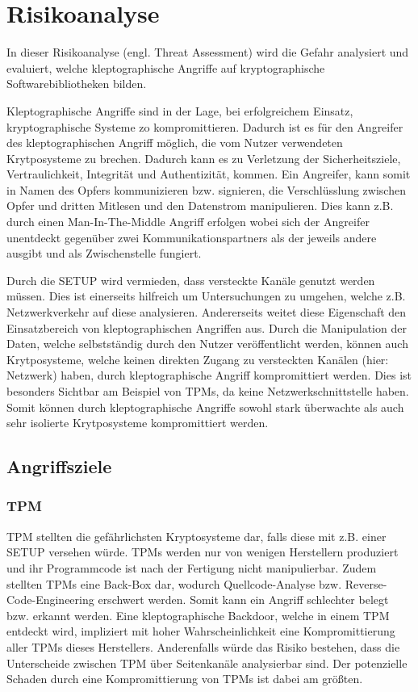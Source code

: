 \chapter{Risikoanalyse}
    In dieser Risikoanalyse (engl. Threat Assessment) wird die Gefahr analysiert und evaluiert, welche kleptographische Angriffe auf kryptographische Softwarebibliotheken bilden.

    Kleptographische Angriffe sind in der Lage, bei erfolgreichem Einsatz, kryptographische Systeme zo kompromittieren. Dadurch ist es für den Angreifer des kleptographischen Angriff möglich, die vom Nutzer verwendeten Krytposysteme zu brechen. Dadurch kann es zu Verletzung der Sicherheitsziele, Vertraulichkeit, Integrität und Authentizität, kommen. Ein Angreifer, kann somit in Namen des Opfers kommunizieren bzw. signieren, die Verschlüsslung zwischen Opfer und dritten Mitlesen und den Datenstrom manipulieren. Dies kann z.B. durch einen Man-In-The-Middle Angriff erfolgen wobei sich der Angreifer unentdeckt gegenüber zwei Kommunikationspartners als der jeweils andere ausgibt und als Zwischenstelle fungiert.

    Durch die \ac{SETUP} wird vermieden, dass versteckte Kanäle genutzt werden müssen. Dies ist einerseits hilfreich um Untersuchungen zu umgehen, welche z.B. Netzwerkverkehr auf diese analysieren. Andererseits weitet diese Eigenschaft den Einsatzbereich von kleptographischen Angriffen aus. Durch die Manipulation der Daten, welche selbstständig durch den Nutzer veröffentlicht werden, können auch Krytposysteme, welche keinen direkten Zugang zu versteckten Kanälen (hier: Netzwerk) haben, durch kleptographische Angriff kompromittiert werden. Dies ist besonders Sichtbar am Beispiel von \ac{TPM}s, da keine Netzwerkschnittstelle haben. Somit können durch kleptographische Angriffe sowohl stark überwachte als auch sehr isolierte Krytposysteme kompromittiert werden. 

    \section{Angriffsziele}
        \subsection{TPM}
            \ac{TPM} stellten die gefährlichsten Kryptosysteme dar, falls diese mit z.B. einer \ac{SETUP} versehen würde. \ac{TPM}s werden nur von wenigen Herstellern produziert und ihr Programmcode ist nach der Fertigung nicht manipulierbar. Zudem stellten \ac{TPM}s eine Back-Box dar, wodurch Quellcode-Analyse bzw. Reverse-Code-Engineering erschwert werden. Somit kann ein Angriff schlechter belegt bzw. erkannt werden. Eine kleptographische Backdoor, welche in einem \ac{TPM} entdeckt wird, impliziert mit hoher Wahrscheinlichkeit eine Kompromittierung aller \ac{TPM}s dieses Herstellers. Anderenfalls würde das Risiko bestehen, dass die Unterscheide zwischen \ac{TPM} über Seitenkanäle analysierbar sind.
            Der potenzielle Schaden durch eine Kompromittierung von \ac{TPM}s ist dabei am größten.

